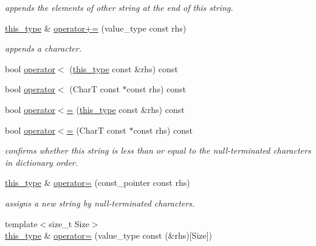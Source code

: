 \begin{DoxyCompactItemize}
\begin{DoxyCompactList}\small\item\em appends the elements of other string at the end of this string. \end{DoxyCompactList}\item 
\hypertarget{classhryky_1_1_string_ad08fc0721b2e71f6e843a638569d8f93}{\hyperlink{classhryky_1_1_string}{this\-\_\-type} \& \hyperlink{classhryky_1_1_string_ad08fc0721b2e71f6e843a638569d8f93}{operator+=} (value\-\_\-type const rhs)}\label{classhryky_1_1_string_ad08fc0721b2e71f6e843a638569d8f93}

\begin{DoxyCompactList}\small\item\em appends a character. \end{DoxyCompactList}\item 
bool \hyperlink{classhryky_1_1_string_a512d05bfbcc25d0946344e5494e05342}{operator$<$} (\hyperlink{classhryky_1_1_string}{this\-\_\-type} const \&rhs) const 
\item 
bool \hyperlink{classhryky_1_1_string_a7e287629be7b7f2e7e5228ca388c5f13}{operator$<$} (Char\-T const $\ast$const rhs) const 
\item 
bool \hyperlink{classhryky_1_1_string_a8722fa391d4ee8b119092502840a4146}{operator$<$=} (\hyperlink{classhryky_1_1_string}{this\-\_\-type} const \&rhs) const 
\item 
bool \hyperlink{classhryky_1_1_string_ac358d7f8d06264f161ecd3d5c5a4b154}{operator$<$=} (Char\-T const $\ast$const rhs) const 
\begin{DoxyCompactList}\small\item\em confirms whether this string is less than or equal to the null-\/terminated characters in dictionary order. \end{DoxyCompactList}\item 
\hypertarget{classhryky_1_1_string_a65d2ec00521600df0d838c8b4b4ee61e}{\hyperlink{classhryky_1_1_string}{this\-\_\-type} \& \hyperlink{classhryky_1_1_string_a65d2ec00521600df0d838c8b4b4ee61e}{operator=} (const\-\_\-pointer const rhs)}\label{classhryky_1_1_string_a65d2ec00521600df0d838c8b4b4ee61e}

\begin{DoxyCompactList}\small\item\em assigns a new string by null-\/terminated characters. \end{DoxyCompactList}\item 
\hypertarget{classhryky_1_1_string_a29ae518048a170155f5addfd6c47b2ed}{{\footnotesize template$<$size\-\_\-t Size$>$ }\\\hyperlink{classhryky_1_1_string}{this\-\_\-type} \& \hyperlink{classhryky_1_1_string_a29ae518048a170155f5addfd6c47b2ed}{operator=} (value\-\_\-type const (\&rhs)\mbox{[}Size\mbox{]})}\label{classhryky_1_1_string_a29ae518048a170155f5addfd6c47b2ed}


\end{DoxyCompactItemize}
